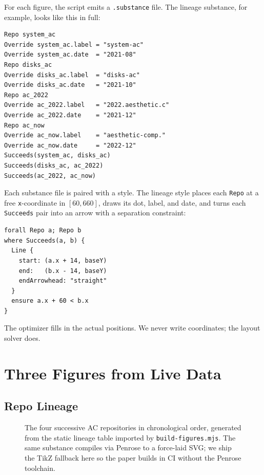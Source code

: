 \documentclass[10pt,letterpaper,twocolumn]{article}
\begin{document}
For each figure, the script emits a \texttt{.substance} file. The lineage substance, for example, looks like this in full:

\begin{lstlisting}[language=penrose]
Repo system_ac
Override system_ac.label = "system-ac"
Override system_ac.date  = "2021-08"
Repo disks_ac
Override disks_ac.label  = "disks-ac"
Override disks_ac.date   = "2021-10"
Repo ac_2022
Override ac_2022.label   = "2022.aesthetic.c"
Override ac_2022.date    = "2021-12"
Repo ac_now
Override ac_now.label    = "aesthetic-comp."
Override ac_now.date     = "2022-12"
Succeeds(system_ac, disks_ac)
Succeeds(disks_ac, ac_2022)
Succeeds(ac_2022, ac_now)
\end{lstlisting}

Each substance file is paired with a style. The lineage style places each \texttt{Repo} at a free \texttt{x}-coordinate in $[60, 660]$, draws its dot, label, and date, and turns each \texttt{Succeeds} pair into an arrow with a separation constraint:

\begin{lstlisting}[language=penrose]
forall Repo a; Repo b
where Succeeds(a, b) {
  Line {
    start: (a.x + 14, baseY)
    end:   (b.x - 14, baseY)
    endArrowhead: "straight"
  }
  ensure a.x + 60 < b.x
}
\end{lstlisting}

The optimizer fills in the actual positions. We never write coordinates; the layout solver does.


\section{Three Figures from Live Data}

\subsection{Repo Lineage}

\begin{figure}[h]
\centering

\caption{The four successive AC repositories in chronological order, generated from the static lineage table imported by \texttt{build-figures.mjs}. The same substance compiles via Penrose to a force-laid SVG; we ship the TikZ fallback here so the paper builds in CI without the Penrose toolchain.}
\label{fig:lineage}
\end{figure}
\end{document}
